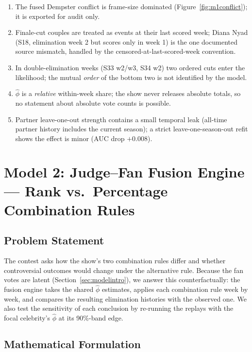 \documentclass[10pt]{article}
\begin{document}
\begin{enumerate}[itemsep=1pt]
\item The fused Dempster conflict is frame-size dominated (Figure~\ref{fig:m1conflict});
it is exported for audit only.
\item Finale-cut couples are treated as events at their last scored week; Diana Nyad
(S18, elimination week 2 but scores only in week 1) is the one documented source mismatch,
handled by the censored-at-last-scored-week convention.
\item In double-elimination weeks (S33 w2/w3, S34 w2) two ordered cuts enter the
likelihood; the mutual \emph{order} of the bottom two is not identified by the model.
\item $\hat\phi$ is a \emph{relative} within-week share; the show never releases absolute
totals, so no statement about absolute vote counts is possible.
\item Partner leave-one-out strength contains a small temporal leak (all-time partner
history includes the current season); a strict leave-one-season-out refit shows the effect
is minor (AUC drop $+0.008$).
\end{enumerate}

\section{Model 2: Judge--Fan Fusion Engine --- Rank vs.\ Percentage Combination Rules}
\label{sec:model2}

\subsection{Problem Statement}

The contest asks how the show's two combination rules differ and whether
controversial outcomes would change under the alternative rule. Because the
fan votes are latent (Section~\ref{sec:modelintro}), we answer this
counterfactually: the fusion engine takes the shared $\hat\phi$ estimates,
applies each combination rule week by week, and compares the resulting
elimination histories with the observed one. We also test the sensitivity of
each conclusion by re-running the replays with the focal celebrity's
$\hat\phi$ at its 90\%-band edge.

\subsection{Mathematical Formulation}
\end{document}
